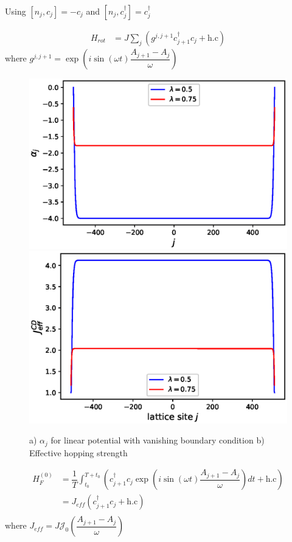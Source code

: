 \documentclass[11pt,a4paper]{article}
\begin{document}
Using $[n_j,c_j ]= -c_j$ and $[n_j,c_j^{\dagger} ]= c_j^{\dagger}$

\begin{align*}
H_{rot}&= J\sum_j   ( g^{j, j+1} c_{j+1}^{\dagger} c_j + \mbox{h.c})
\end{align*}
where $g^{j, j+1}= \exp\left(i \sin(\omega t) \dfrac{A_{j+1}- A_j}{\omega}\right)$

\begin{figure}[!ht]
\begin{center}
\includegraphics[scale=0.5]{pics/alpha_j_linear_potn.eps}
\includegraphics[scale=0.5]{pics/j_eff_cd.eps}
\caption{a) $\alpha_j$ for linear potential with vanishing boundary condition b) Effective hopping strength }
\end{center}
\end{figure}

\begin{align*}
H_F^{(0)}&= \dfrac{1}{T}   \int_{t_0}^{T+t_0}(c_{j+1}^{\dagger} c_j \exp\left(i \sin(\omega t) \dfrac{A_{j+1}- A_j}{\omega}\right) dt + \mbox{h.c})\\
&= J_{eff} (c_{j+1}^{\dagger} c_j + \mbox{h.c})\\
\end{align*}
where $J_{eff}=J \mathcal{J}_0 \left(\dfrac{A_{j+1}- A_j}{\omega}\right)$
\end{document}
